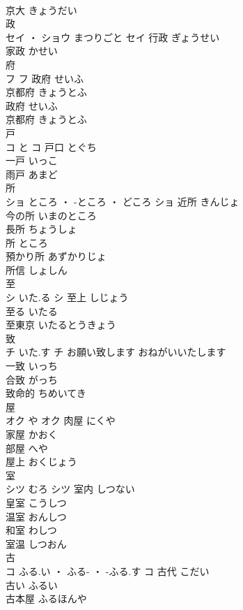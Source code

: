 \documentclass[8pt]{extreport}
\begin{document}
\begin{CJK}{UTF8}{min}
\\	京大	きょうだい	
\\	政	
\\	セイ ・ ショウ	まつりごと	セイ	行政	ぎょうせい	
\\	家政	かせい	
\\	府	
\\	フ		フ	政府	せいふ	
\\	京都府	きょうとふ	
\\	政府	せいふ	
\\	京都府	きょうとふ	
\\	戸	
\\	コ	と	コ	戸口	とぐち	
\\	一戸	いっこ	
\\	雨戸	あまど	
\\	所	
\\	ショ	ところ ・ -ところ ・ どころ	ショ	近所	きんじょ	
\\	今の所	いまのところ	
\\	長所	ちょうしょ	
\\	所	ところ	
\\	預かり所	あずかりじょ	
\\	所信	しょしん	
\\	至	
\\	シ	いた.る	シ	至上	しじょう	
\\	至る	いたる	
\\	至東京	いたるとうきょう	
\\	致	
\\	チ	いた.す	チ	お願い致します	おねがいいたします	
\\	一致	いっち	
\\	合致	がっち	
\\	致命的	ちめいてき	
\\	屋	
\\	オク	や	オク	肉屋	にくや	
\\	家屋	かおく	
\\	部屋	へや	
\\	屋上	おくじょう	
\\	室	
\\	シツ	むろ	シツ	室内	しつない	
\\	皇室	こうしつ	
\\	温室	おんしつ	
\\	和室	わしつ	
\\	室温	しつおん	
\\	古	
\\	コ	ふる.い ・ ふる- ・ -ふる.す	コ	古代	こだい	
\\	古い	ふるい	
\\	古本屋	ふるほんや	

\end{CJK}
\end{document}
